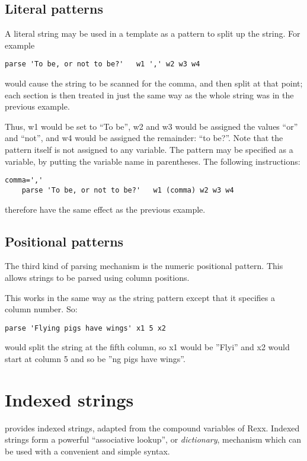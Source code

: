 \subsection{Literal patterns}
A literal string may be used in a template as a pattern to split up
the string. For example
\begin{lstlisting}[label=parse,caption=Parse]
    parse 'To be, or not to be?'   w1 ',' w2 w3 w4
\end{lstlisting}
would cause the string to be scanned for the comma, and then split at that point; each section is then treated in just the same way as the whole string was in the previous example.

Thus, w1 would be set to “To be”, w2 and w3 would be assigned the values “or” and “not”, and w4 would be assigned the remainder: “to be?”. Note that the pattern itself is not assigned to any variable.
The pattern may be specified as a variable, by putting the variable
name in parentheses. The following instructions:
\begin{lstlisting}[label=comma,caption=Parse with comma]
    comma=','
    parse 'To be, or not to be?'   w1 (comma) w2 w3 w4
\end{lstlisting}
therefore have the same effect as the previous example.
\subsection{Positional patterns}
The third kind of parsing mechanism is the numeric positional
pattern. This allows strings to be parsed using column positions.

This works in the same way as the string pattern except that it
specifies a column number. So:
\begin{lstlisting}[label=positional,caption=Positional Parsing]
    parse 'Flying pigs have wings' x1 5 x2
\end{lstlisting}                        
would split the string at the fifth column, so x1 would be ”Flyi” 
and x2 would start at column 5 and so be ”ng pigs have wings”.
                                        
\section{Indexed strings}
\nr{} provides indexed strings, adapted from the compound variables of Rexx. Indexed strings form a powerful “associative lookup”, or \emph{dictionary}, mechanism which can be used with a convenient and simple syntax.

